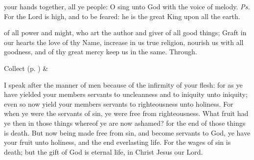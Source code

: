 \clearpage
{}


\introit
{} your hands together, all ye people: O sing unto God with the voice of melody. \textit{Ps.} For the Lord is high, and to be feared: he is the great King upon all the earth.

\collect
{} of all power and might, who art the author and giver of all good things; Graft in our hearts the love of thy Name, increase in us true religion, nourish us with all goodness, and of thy great mercy keep us in the same. Through.

\begin{rubric}
     Collect  (p. \pageref{SPSaints}) \&  
\end{rubric}

 I speak after the manner of men because of the infirmity of your flesh: for as ye have yielded your members servants to uncleanness and to iniquity unto iniquity; even so now yield your members servants to righteousness unto holiness. For when ye were the servants of sin, ye were free from righteousness. What fruit had ye then in those things whereof ye are now ashamed? for the end of those things is death. But now being made free from sin, and become servants to God, ye have your fruit unto holiness, and the end everlasting life. For the wages of sin is death; but the gift of God is eternal life, in Christ Jesus our Lord.


